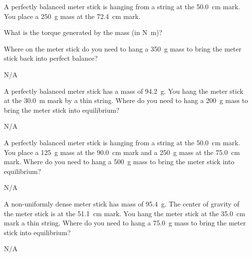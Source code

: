 \begin{question}[ID=torque-C-Q01,topic=torque,difficulty=C]
    A perfectly balanced meter stick is hanging from a string
        at the \SI{50.0}{\centi\meter} mark.
    You place a \SI{250}{\gram} mass at the \SI{72.4}{\centi\meter} mark.
    \begin{enumerate*}[label=\arabic*)]
        \item What is the torque generated by the mass (in \si{\newton\meter})?
        \item Where on the meter stick do you need to hang a \SI{350}{\gram}
            mass to bring the meter stick back into perfect balance?
    \end{enumerate*}
\end{question}
\begin{solution}
    N/A
\end{solution}


\begin{question}[ID=torque-C-Q02,topic=torque,difficulty=C]
    A perfectly balanced meter stick has a mass of \SI{94.2}{\gram}.
    You hang the meter stick at the \SI{30.0}{\meter} mark by a thin string.
    Where do you need to hang a \SI{200}{\gram} mass to bring the meter
        stick into equilibrium?
\end{question}
\begin{solution}
    N/A
\end{solution}


\begin{question}[ID=torque-C-Q03,topic=torque,difficulty=C]
    A perfectly balanced meter stick is hanging from a string at
        the \SI{50.0}{\centi\meter} mark.
    You place a \SI{125}{\gram} mass at the \SI{90.0}{\centi\meter} mark
        and a \SI{250}{\gram} mass at the \SI{75.0}{\centi\meter} mark.
    Where do you need to hang a \SI{500}{\gram} mass to bring the meter
        stick into equilibrium?
\end{question}
\begin{solution}
    N/A
\end{solution}


\begin{question}[ID=torque-C-Q04,topic=torque,difficulty=C]
    A non-uniformly dense meter stick has mass of \SI{95.4}{\gram}.
    The center of gravity of the meter stick is at
        the \SI{51.1}{\centi\meter} mark.
    You hang the meter stick at the \SI{35.0}{\centi\meter} mark
        a thin string.
    Where do you need to hang a \SI{75.0}{\gram} mass to bring
        the meter stick into equilibrium?
\end{question}
\begin{solution}
    N/A
\end{solution}


